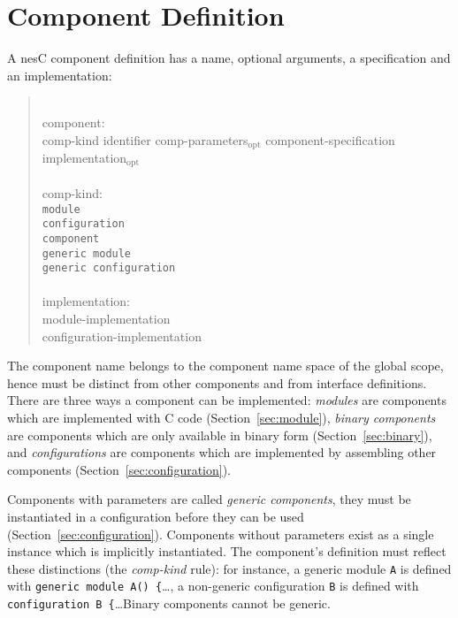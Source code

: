 \documentclass[11pt,letterpaper]{article}
\newcommand{\kw}[1]{{\tt #1}}
\newcommand{\code}[1]{{\tt #1}}
\newcommand{\nesc}{nesC\xspace}
\newcommand{\opt}{$_{\mbox{opt}}$\xspace}
\newcommand{\grammarshift}{\vspace*{-.7cm}}
\newcommand{\grammarindent}{\hspace*{2cm}\= \\ \kill}
\begin{document}
\section{Component Definition}
\label{sec:component}

A \nesc component definition has a name, optional arguments, a
specification and an implementation:
\begin{quote} \grammarshift \em \begin{tabbing}
\grammarindent
component:\\
\>	comp-kind identifier comp-parameters\opt component-specification implementation\opt\\
\\
comp-kind:\\
\>	\kw{module}\\
\>	\kw{configuration}\\
\>	\kw{component}\\
\>	\kw{generic module}\\
\>	\kw{generic configuration}\\
\\
implementation:\\
\>	module-implementation\\
\>	configuration-implementation
\end{tabbing} \end{quote}

The component name belongs to the component name space of the global scope,
hence must be distinct from other components and from interface
definitions. There are three ways a component can be implemented:
\emph{modules} are components which are implemented with C code
(Section~\ref{sec:module}), \emph{binary components} are components which
are only available in binary form (Section~\ref{sec:binary}), and
\emph{configurations} are components which are implemented by assembling
other components (Section~\ref{sec:configuration}).

Components with parameters are called \emph{generic components}, they must
be instantiated in a configuration before they can be used
(Section~\ref{sec:configuration}). Components without parameters exist as a
single instance which is implicitly instantiated. The component's
definition must reflect these distinctions (the \emph{comp-kind} rule): for
instance, a generic module \code{A} is defined with \code{generic module
A() \{}\ldots, a non-generic configuration \code{B} is defined with
\code{configuration B \{}\ldots Binary components cannot be generic.
\end{document}
